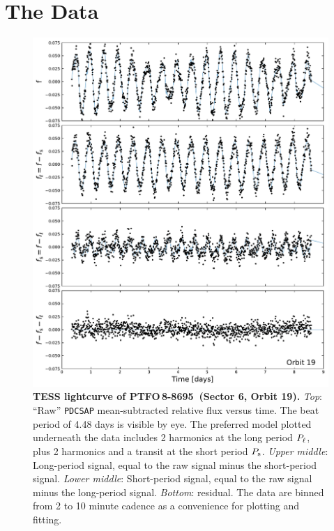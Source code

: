 \documentclass[12pt,twocolumn,tighten]{aastex62}
\newcommand{\ptfo}{PTFO$\,$8-8695}
\begin{document}
\section{The Data}
\label{sec:observations}

\begin{figure}[t!]
	\begin{center}
		\leavevmode
		\includegraphics[width=1\textwidth]{f1.pdf}
	\end{center}
	\vspace{-0.7cm}
	\caption{
		{\bf TESS lightcurve of \ptfo\ (Sector 6, Orbit 19).}
    {\it Top}: ``Raw'' \texttt{PDCSAP} mean-subtracted relative flux
    versus time. The beat period of 4.48 days is visible by eye.  The
    preferred model plotted underneath the data includes 2 harmonics
    at the long period $P_{\rm \ell}$, plus 2 harmonics and a transit
    at the short period $P_{\rm s}$.
		{\it Upper middle}: Long-period signal, equal to the raw signal
		minus the short-period signal.
		{\it Lower middle}: Short-period signal, equal to the raw signal
		minus the long-period signal.
		{\it Bottom}: residual.  The data are binned from 2 to 10 minute
		cadence as a convenience for plotting and fitting.
		\label{fig:splitsignal}
	}
\end{figure}
\end{document}
